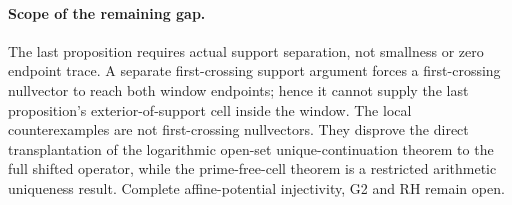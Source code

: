 \paragraph{Scope of the remaining gap.}
The last proposition requires actual support separation, not smallness
or zero endpoint trace. A separate first-crossing support argument forces
a first-crossing nullvector to reach both window endpoints; hence it
cannot supply the last proposition's exterior-of-support cell inside
the window. The local counterexamples are not first-crossing nullvectors.
They disprove the direct transplantation of the logarithmic open-set
unique-continuation theorem to the full shifted operator, while the
prime-free-cell theorem is a restricted arithmetic uniqueness result.
Complete affine-potential injectivity, G2 and RH remain open.
